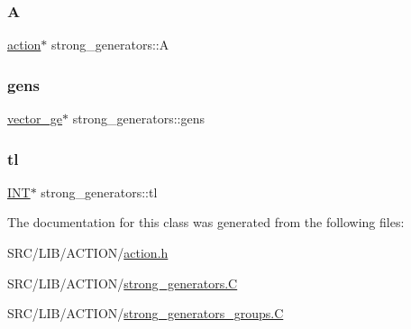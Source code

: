 \subsubsection{\texorpdfstring{A}{A}}
{\footnotesize\ttfamily \mbox{\hyperlink{classaction}{action}}$\ast$ strong\+\_\+generators\+::A}

\mbox{\label{classstrong__generators_a7ef80c63fd292c3dd5ee61ffb93cafe6}} 
\subsubsection{\texorpdfstring{gens}{gens}}
{\footnotesize\ttfamily \mbox{\hyperlink{classvector__ge}{vector\+\_\+ge}}$\ast$ strong\+\_\+generators\+::gens}

\mbox{\label{classstrong__generators_a185626ce6dd382027712395900c47c6d}} 
\subsubsection{\texorpdfstring{tl}{tl}}
{\footnotesize\ttfamily \mbox{\hyperlink{galois_8h_a09fddde158a3a20bd2dcadb609de11dc}{I\+NT}}$\ast$ strong\+\_\+generators\+::tl}



The documentation for this class was generated from the following files\+:\begin{DoxyCompactItemize}
\item 
S\+R\+C/\+L\+I\+B/\+A\+C\+T\+I\+O\+N/\mbox{\hyperlink{action_8h}{action.\+h}}\item 
S\+R\+C/\+L\+I\+B/\+A\+C\+T\+I\+O\+N/\mbox{\hyperlink{strong__generators_8_c}{strong\+\_\+generators.\+C}}\item 
S\+R\+C/\+L\+I\+B/\+A\+C\+T\+I\+O\+N/\mbox{\hyperlink{strong__generators__groups_8_c}{strong\+\_\+generators\+\_\+groups.\+C}}\end{DoxyCompactItemize}

